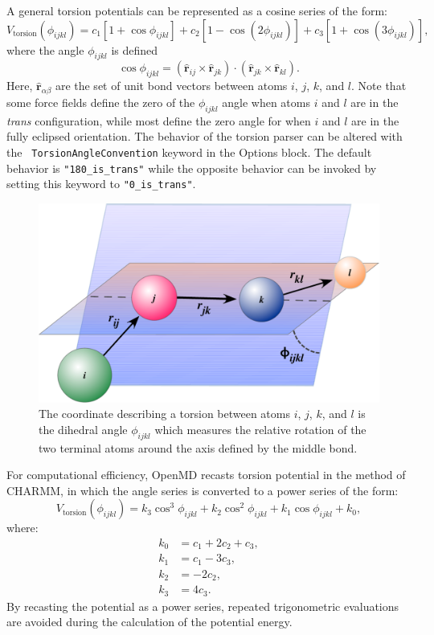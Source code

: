 \documentclass[letterpaper]{report}
\begin{document}
A general torsion potentials can be represented as a cosine series of
the form:
\begin{equation}
V_{\text{torsion}}(\phi_{ijkl}) = c_1[1 + \cos \phi_{ijkl}] 
	+ c_2[1 - \cos(2\phi_{ijkl})] 
 	+ c_3[1 + \cos(3\phi_{ijkl})],
\label{eq:origTorsionPot}
\end{equation}
where the angle $\phi_{ijkl}$ is defined 
\begin{equation}
\cos\phi_{ijkl} = (\hat{\mathbf{r}}_{ij} \times \hat{\mathbf{r}}_{jk}) \cdot
	(\hat{\mathbf{r}}_{jk} \times \hat{\mathbf{r}}_{kl}).
\label{eq:torsPhi}
\end{equation}
Here, $\hat{\mathbf{r}}_{\alpha\beta}$ are the set of unit bond
vectors between atoms $i$, $j$, $k$, and $l$.  Note that some force
fields define the zero of the $\phi_{ijkl}$ angle when atoms $i$ and
$l$ are in the {\em trans} configuration, while most define the zero
angle for when $i$ and $l$ are in the fully eclipsed orientation.  The
behavior of the torsion parser can be altered with the {\tt
  TorsionAngleConvention} keyword in the Options block.  The default
behavior is {\tt "180\_is\_trans"} while the opposite behavior can be
invoked by setting this keyword to {\tt "0\_is\_trans"}.

\begin{figure}[h]
\centering
\includegraphics[width=4.5in]{torsion.pdf}
\caption[Torsion or dihedral angle coordinates]{The coordinate
  describing a torsion between atoms $i$, $j$, $k$, and $l$ is the
  dihedral angle $\phi_{ijkl}$ which measures the relative rotation of
  the two terminal atoms around the axis defined by the middle bond. }
\label{fig:torsion}
\end{figure}

For computational efficiency, OpenMD recasts torsion potential in the
method of CHARMM,\cite{Brooks83} in which the angle series is
converted to a power series of the form:
\begin{equation}
  V_{\text{torsion}}(\phi_{ijkl}) =  
  k_3 \cos^3 \phi_{ijkl} + k_2 \cos^2 \phi_{ijkl} + k_1 \cos \phi_{ijkl} + k_0,
\label{eq:torsionPot}
\end{equation}
where:
\begin{align*}
k_0 &= c_1 + 2 c_2 + c_3, \\
k_1 &= c_1 - 3c_3, \\
k_2 &= - 2 c_2, \\
k_3 &= 4 c_3.
\end{align*}
By recasting the potential as a power series, repeated trigonometric
evaluations are avoided during the calculation of the potential
energy.
\end{document}
